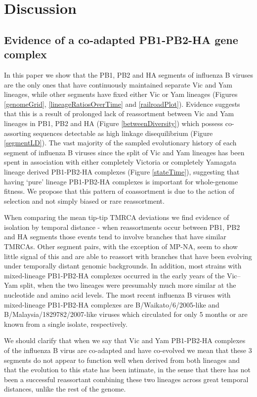 \documentclass[11pt,oneside,letterpaper]{article}
\begin{document}
\section*{Discussion}

\subsection*{Evidence of a co-adapted PB1-PB2-HA gene complex}
In this paper we show that the PB1, PB2 and HA segments of influenza B viruses are the only ones that have continuously maintained separate Vic and Yam lineages, while other segments have fixed either Vic or Yam lineages (Figures \ref{genomeGrid}, \ref{lineageRatiosOverTime} and \ref{railroadPlot}).
Evidence suggests that this is a result of prolonged lack of reassortment between Vic and Yam lineages in PB1, PB2 and HA (Figure \ref{betweenDiversity}) which possess co-assorting sequences detectable as high linkage disequilibrium (Figure \ref{segmentLD}).
The vast majority of the sampled evolutionary history of each segment of influenza B viruses since the split of Vic and Yam lineages has been spent in association with either completely Victoria or completely Yamagata lineage derived PB1-PB2-HA complexes (Figure \ref{stateTime}), suggesting that having `pure' lineage PB1-PB2-HA complexes is important for whole-genome fitness.
We propose that this pattern of coassortment is due to the action of selection and not simply biased or rare reassortment.

When comparing the mean tip-tip TMRCA deviations we find evidence of isolation by temporal distance - when reassortments occur between PB1, PB2 and HA segments those events tend to involve branches that have similar TMRCAs.
Other segment pairs, with the exception of MP-NA, seem to show little signal of this and are able to reassort with branches that have been evolving under temporally distant genomic backgrounds.
In addition, most strains with mixed-lineage PB1-PB2-HA complexes occurred in the early years of the Vic--Yam split, when the two lineages were presumably much more similar at the nucleotide and amino acid levels.
The most recent influenza B viruses with mixed-lineage PB1-PB2-HA complexes are B/Waikato/6/2005-like and B/Malaysia/1829782/2007-like viruses which circulated for only 5 months or are known from a single isolate, respectively.

We should clarify that when we say that Vic and Yam PB1-PB2-HA complexes of the influenza B virus are co-adapted and have co-evolved we mean that these 3 segments do not appear to function well when derived from both lineages and that the evolution to this state has been intimate, in the sense that there has not been a successful reassortant combining these two lineages across great temporal distances, unlike the rest of the genome.
\end{document}
